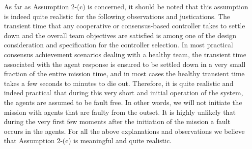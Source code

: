 \documentclass[12pt,draftcls,onecolumn]{IEEEtran}
\begin{document}
 As far as Assumption 2-(c) is concerned, it should be
noted that this assumption is indeed quite realistic for
the following observations and justications. The transient
time that any cooperative or consensus-based controller
takes to settle down and the overall team objectives
are satisfied is among one of the design consideration
and specification for the controller selection. In most
practical consensus achievement scenarios dealing with a healthy team, the transient time associated with the
agent response is ensured to be settled down in a very
small fraction of the entire mission time, and in most
cases the healthy transient time takes a few seconds to
minutes to die out. Therefore, it is quite realistic and
indeed practical that during this very short and initial
operation of the system, the agents are assumed to be
fault free. In other words, we will not initiate the mission
with agents that are faulty from the outset. It is highly
unlikely that during the very first few moments after the
initiation of the mission a fault occurs in the agents. For
all the above explanations and observations we believe
that Assumption 2-(c) is meaningful and quite realistic.
\end{document}
